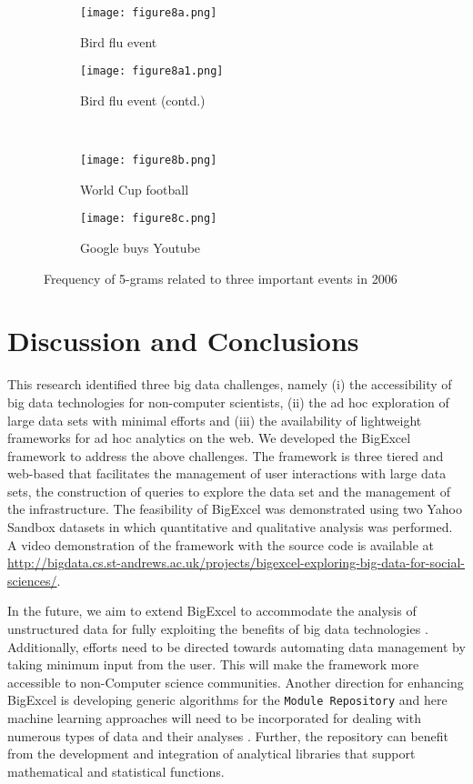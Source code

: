 \documentclass[10pt, conference, compsocconf]{IEEEtran}
\begin{document}
\begin{figure*}
	\centering
	\begin{subfigure} {0.48\textwidth}
		\centering
  		\texttt{[image: figure8a.png]}
  		\caption{Bird flu event}
  		\label{figure8a}
	\end{subfigure} \hfill
	\begin{subfigure} {0.48\textwidth}
		\centering
		\texttt{[image: figure8a1.png]}
		\caption{Bird flu event (contd.)}
		\label{figure8a1}
	\end{subfigure} \\
	\begin{subfigure} {0.48\textwidth}
		\centering
  		\texttt{[image: figure8b.png]}
  		\caption{World Cup football}
  		\label{figure8b}
	\end{subfigure} \hfill
	\begin{subfigure} {0.48\textwidth}
		\centering
		\texttt{[image: figure8c.png]}
		\caption{Google buys Youtube}
		\label{figure8c}
	\end{subfigure} 
	\caption{Frequency of 5-grams related to three important events in 2006}
	\label{figure8}
\end{figure*} 


\section{Discussion and Conclusions}
\label{conclusions}

This research identified three big data challenges, namely (i) the accessibility of big data technologies for non-computer scientists, (ii) the ad hoc exploration of large data sets with minimal efforts and (iii) the availability of lightweight frameworks for ad hoc analytics on the web. We developed the BigExcel framework to address the above challenges. The framework is three tiered and web-based that facilitates the management of user interactions with large data sets, the construction of queries to explore the data set and the management of the infrastructure. The feasibility of BigExcel was demonstrated using two Yahoo Sandbox datasets in which quantitative and qualitative analysis was performed. A video demonstration of the framework with the source code is available at \url{http://bigdata.cs.st-andrews.ac.uk/projects/bigexcel-exploring-big-data-for-social-sciences/}. 

In the future, we aim to extend BigExcel to accommodate the analysis of unstructured data for fully exploiting the benefits of big data technologies \cite{bigdata-2, bigdata-3}. Additionally, efforts need to be directed towards automating data management by taking minimum input from the user. This will make the framework more accessible to non-Computer science communities. Another direction for enhancing BigExcel is developing generic algorithms for the \texttt{Module Repository} and here machine learning approaches will need to be incorporated for dealing with numerous types of data and their analyses \cite{bigdata-2}. Further, the repository can benefit from the development and integration of analytical libraries that support mathematical and statistical functions.
\end{document}
